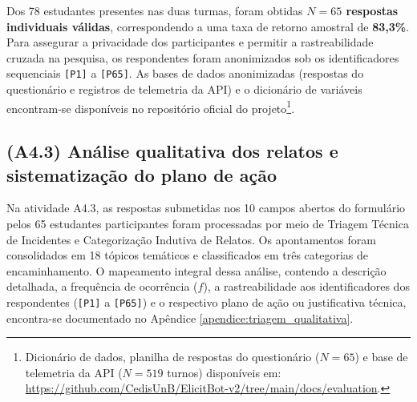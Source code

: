Dos 78 estudantes presentes nas duas turmas, foram obtidas \textbf{$N = 65$ respostas individuais válidas}, correspondendo a uma taxa de retorno amostral de \textbf{83,3\%}. Para assegurar a privacidade dos participantes e permitir a rastreabilidade cruzada na pesquisa, os respondentes foram anonimizados sob os identificadores sequenciais \texttt{[P1]} a \texttt{[P65]}. As bases de dados anonimizadas (respostas do questionário e registros de telemetria da API) e o dicionário de variáveis encontram-se disponíveis no repositório oficial do projeto\footnote{Dicionário de dados, planilha de respostas do questionário ($N = 65$) e base de telemetria da API ($N = 519$ turnos) disponíveis em: \url{https://github.com/CedisUnB/ElicitBot-v2/tree/main/docs/evaluation}.}.

\subsection{(A4.3) Análise qualitativa dos relatos e sistematização do plano de ação}
\label{subsec:exec_a43}

Na atividade A4.3, as respostas submetidas nos 10 campos abertos do formulário pelos 65 estudantes participantes foram processadas por meio de Triagem Técnica de Incidentes e Categorização Indutiva de Relatos. Os apontamentos foram consolidados em 18 tópicos temáticos e classificados em três categorias de encaminhamento. O mapeamento integral dessa análise, contendo a descrição detalhada, a frequência de ocorrência ($f$), a rastreabilidade aos identificadores dos respondentes (\texttt{[P1]} a \texttt{[P65]}) e o respectivo plano de ação ou justificativa técnica, encontra-se documentado no Apêndice \ref{apendice:triagem_qualitativa}.

